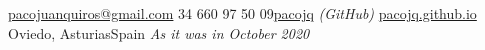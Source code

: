 \documentclass[10pt,a4paper]{article} %
\begin{document}
 



\noindent\href{mailto:pacojuanquiros@gmail.com}{pacojuanquiros@gmail.com}\bull %
\textsmaller{+}34 660 97 50 09\bull \href{http://www.github.com/pacojq}{pacojq} \textit{(GitHub)}\bull %
\href{http://pacojq.github.io}{pacojq.github.io} \\ %
Oviedo, Asturias\bull Spain \bull \textit{As it was in October 2020}%

\spacedhrule{0.9em}{-0.4em} %







\end{document}
